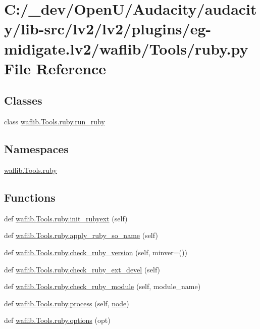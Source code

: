 \hypertarget{lv2_2plugins_2eg-midigate_8lv2_2waflib_2_tools_2ruby_8py}{}\section{C\+:/\+\_\+dev/\+Open\+U/\+Audacity/audacity/lib-\/src/lv2/lv2/plugins/eg-\/midigate.lv2/waflib/\+Tools/ruby.py File Reference}
\label{lv2_2plugins_2eg-midigate_8lv2_2waflib_2_tools_2ruby_8py}
\subsection*{Classes}
\begin{DoxyCompactItemize}
\item 
class \hyperlink{classwaflib_1_1_tools_1_1ruby_1_1run__ruby}{waflib.\+Tools.\+ruby.\+run\+\_\+ruby}
\end{DoxyCompactItemize}
\subsection*{Namespaces}
\begin{DoxyCompactItemize}
\item 
 \hyperlink{namespacewaflib_1_1_tools_1_1ruby}{waflib.\+Tools.\+ruby}
\end{DoxyCompactItemize}
\subsection*{Functions}
\begin{DoxyCompactItemize}
\item 
def \hyperlink{namespacewaflib_1_1_tools_1_1ruby_aefe90baeace8b05bd0038dec33a25d4f}{waflib.\+Tools.\+ruby.\+init\+\_\+rubyext} (self)
\item 
def \hyperlink{namespacewaflib_1_1_tools_1_1ruby_a91ccae4c2fd8fd022d9cf0b408b30ba5}{waflib.\+Tools.\+ruby.\+apply\+\_\+ruby\+\_\+so\+\_\+name} (self)
\item 
def \hyperlink{namespacewaflib_1_1_tools_1_1ruby_a6b1426d0a007a1d029dd549463f35792}{waflib.\+Tools.\+ruby.\+check\+\_\+ruby\+\_\+version} (self, minver=())
\item 
def \hyperlink{namespacewaflib_1_1_tools_1_1ruby_a1152f26b41ce01670cf061540c07642a}{waflib.\+Tools.\+ruby.\+check\+\_\+ruby\+\_\+ext\+\_\+devel} (self)
\item 
def \hyperlink{namespacewaflib_1_1_tools_1_1ruby_a56fd37d84970b70e399a27f937a3c8c6}{waflib.\+Tools.\+ruby.\+check\+\_\+ruby\+\_\+module} (self, module\+\_\+name)
\item 
def \hyperlink{namespacewaflib_1_1_tools_1_1ruby_abc8e4baeca74633f0dc718700b547b88}{waflib.\+Tools.\+ruby.\+process} (self, \hyperlink{structnode}{node})
\item 
def \hyperlink{namespacewaflib_1_1_tools_1_1ruby_a81332d72c1973177fb7f913b94ea205d}{waflib.\+Tools.\+ruby.\+options} (opt)
\end{DoxyCompactItemize}
